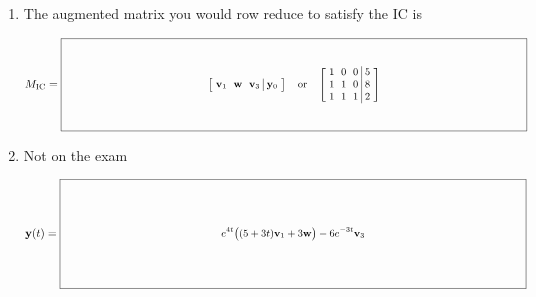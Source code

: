 \documentclass[11pt,letterpaper]{article}
\newcommand{\keybox}[3]{%
  \vcenter{\hbox{$\boxed{\parbox[c][#2][c]{#1}{\centering\small
    \setlength{\arraycolsep}{3pt}\ensuremath{\displaystyle #3}}}$}}}
\begin{document}
\begin{enumerate}
\begin{enumerate}
\vfill
\item The augmented matrix you would row reduce to satisfy the IC is
\par $M_{\mathrm{IC}}=\keybox{5.65in}{1.05in}{\left[\begin{array}{ccc|c}\vect{v}_1&\vect{w}&\vect{v}_3&\vect{y}_0\end{array}\right]
\quad\text{or}\quad\left[\begin{array}{rrr|r}1&0&0&5\\1&1&0&8\\1&1&1&2\end{array}\right]}$
\vfill
\item Not on the exam
\par $\vect{y}(t)=\keybox{5.65in}{1.25in}{e^{4t}\bigl((5+3t)\vect{v}_1+3\vect{w}\bigr)-6e^{-3t}\vect{v}_3}$
\end{enumerate}


\end{enumerate}
\end{document}
